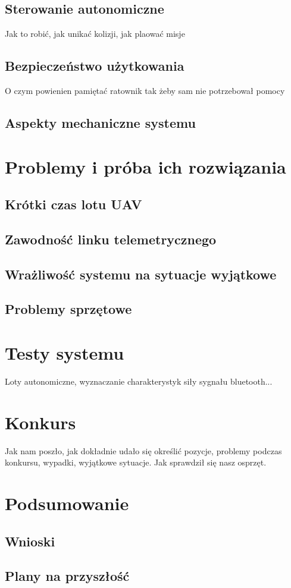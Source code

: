 \subsection{Sterowanie autonomiczne}
Jak to robić, jak unikać kolizji, jak plaować misje
\subsection{Bezpieczeństwo użytkowania}
O czym powienien pamiętać ratownik tak żeby sam nie potrzebował pomocy
\subsection{Aspekty mechaniczne systemu}

\section{Problemy i próba ich rozwiązania}
\subsection{Krótki czas lotu UAV}
\subsection{Zawodność linku telemetrycznego}
\subsection{Wrażliwość systemu na sytuacje wyjątkowe}
\subsection{Problemy sprzętowe}

\section{Testy systemu}
Loty autonomiczne, wyznaczanie charakterystyk siły sygnału bluetooth...

\section{Konkurs}
Jak nam poszło, jak dokładnie udało się określić pozycje, problemy podczas konkursu, wypadki, wyjątkowe sytuacje. Jak sprawdził się nasz osprzęt.

\section{Podsumowanie}
\subsection{Wnioski}
\subsection{Plany na przyszłość}
